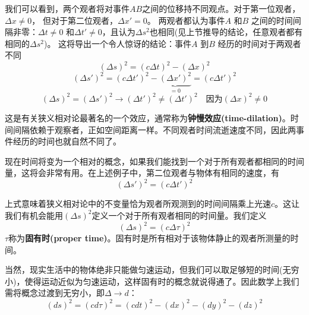 我们可以看到，两个观者将对事件$AB$之间的位移持不同观点。对于第一位观者，$\Delta x \neq 0$， 但对于第二位观者，$\Delta x' = 0$。 两观者都认为事件$A$ 和$B$ 之间的时间间隔非零：$\Delta t \neq 0$ 和$\Delta t' \neq 0$，且认为$\Delta s^2$也相同(见上节推导的结论，任意观者都有相同的$\Delta s^2$)。 这将导出一个令人惊讶的结论：事件$A$ 到$B$ 经历的时间对于两观者不同
\begin{equation}\label{eq2.14}
  (\Delta s)^2
  =(c\Delta t)^2
  -(\Delta x)^2
\end{equation}
\begin{equation}\label{eq2.15}
  (\Delta s')^2
  =(c\Delta t')^2
  -\underbrace{(\Delta x')^2}_{=0}
  =(c\Delta t')^2
\end{equation}
\begin{equation}\label{eq2.16}
   (\Delta s)^2
   = (\Delta s')^2
   \rightarrow
    (\Delta t')^2 \neq
     (\Delta t')^2
     \quad \text{因为}  (\Delta x)^2 \neq 0
\end{equation}

这是有关狭义相对论最著名的一个效应，通常称为{\bf{钟慢效应(time-dilation)}}。时间间隔依赖于观察者，正如空间距离一样。不同观者时间流逝速度不同，因此两事件经历的时间也就自然不同了。

现在时间将变为一个相对的概念，如果我们能找到一个对于所有观者都相同的时间量，这将会非常有用。在上述例子中，第二位观者与物体有相同的速度，有
\begin{equation}\label{eq2.17}
  (\Delta s')^2
  =(c\Delta t')^2
\end{equation}

上式意味着狭义相对论中的不变量恰为观者所观测到的时间间隔乘上光速$c$。这让我们有机会能用$(\Delta s)^2$定义一个对于所有观者相同的时间量。我们定义
\begin{equation}\label{eq2.18}
  (\Delta s)^2
  =(c\Delta \tau)^2
\end{equation}
$\tau$称为{\bf{固有时(proper time)}}。固有时是所有相对于该物体静止的观者所测量的时间。

当然，现实生活中的物体绝非只能做匀速运动，但我们可以取足够短的时间(无穷小)，使得运动近似为匀速运动，这样固有时的概念就说得通了。因此数学上我们需将概念过渡到无穷小，即$\Delta \rightarrow d$：
\begin{equation}\label{eq2.19}
  (ds)^2  =(cd \tau )^2=(cdt)^2-(dx)^2-(dy)^2-(dz)^2
\end{equation}

